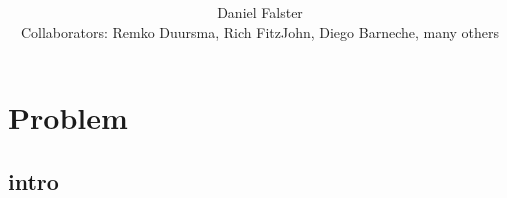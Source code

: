 \documentclass[t]{beamer}
\title[] %
{ }
\author%
{Daniel Falster\inst{1}\\
Collaborators: Remko Duursma\inst{2}, Rich FitzJohn\inst{1}, Diego Barneche\inst{1}, many others }
\institute[Macquarie University, Sydney] %
{
  \inst{1}%
  Biological Sciences,\\
  Macquarie University, Sydney, Australia
  \and
  \inst{2}%
  Hawkesbury Institue for the Environment, \\
  University of Western Sydney, Australia
}
\date[Labchat 2013] %
{}
\begin{document}

\titlepage{}

\section{Problem} \subsection{intro}
\begin{frame}[c]  \frametitle{}
\end{frame}
\end{document}
